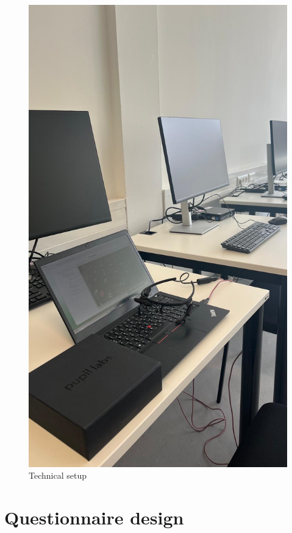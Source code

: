 \begin{figure} [H]
  \centering
  \includegraphics[scale=0.5]{figures/setup.png}
  \caption{Technical setup }
  \label{fig:AnhangsChor}
\end{figure}



\section{Questionnaire design}



